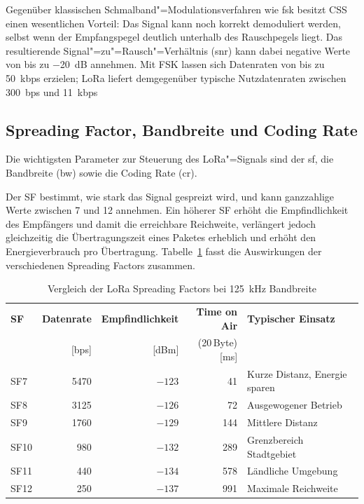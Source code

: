 Gegenüber klassischen Schmalband"=Modulationsverfahren wie \acrshort{fsk} besitzt CSS einen
wesentlichen Vorteil: Das Signal kann noch korrekt demoduliert werden, selbst wenn der
Empfangspegel deutlich unterhalb des Rauschpegels liegt. Das resultierende
Signal"=zu"=Rausch"=Verhältnis (\acrshort{snr}) kann dabei negative Werte von bis zu
\qty{-20}{dB} annehmen. Mit FSK lassen sich Datenraten von bis zu \qty{50}{kbps}
erzielen; LoRa liefert demgegenüber typische Nutzdatenraten zwischen \qty{300}{bps}
und \qty{11}{kbps}~ %

\subsection{Spreading Factor, Bandbreite und Coding Rate}
\label{subsec:sf-bw-cr}

Die wichtigsten Parameter zur Steuerung des LoRa"=Signals sind der \acrfull{sf}, 
die Bandbreite (\acrshort{bw}) sowie die Coding Rate (\acrshort{cr}).

Der SF bestimmt, wie stark das Signal gespreizt wird, und kann ganzzahlige Werte
zwischen 7 und 12 annehmen. Ein höherer SF erhöht die Empfindlichkeit des
Empfängers und damit die erreichbare Reichweite, verlängert jedoch gleichzeitig die
Übertragungszeit eines Paketes erheblich und erhöht den
Energieverbrauch pro Übertragung. Tabelle~\ref{tab:sf_vergleich} fasst die
Auswirkungen der verschiedenen Spreading Factors zusammen.

\begin{table}[htbp]
  \centering
  \caption{Vergleich der LoRa Spreading Factors bei \qty{125}{kHz} Bandbreite}
  \label{tab:sf_vergleich}
  \begin{tabular}{@{}lrrrl@{}}
    \toprule
    \textbf{SF} & \textbf{Datenrate} & \textbf{Empfindlichkeit} &
    \textbf{Time on Air} & \textbf{Typischer Einsatz} \\
                & [bps]        & [dBm]              &
    (20\,Byte) [ms] & \\
    \midrule
    SF7  & 5470 & $-123$ &  41 & Kurze Distanz, Energie sparen \\
    SF8  & 3125 & $-126$ &  72 & Ausgewogener Betrieb \\
    SF9  & 1760 & $-129$ & 144 & Mittlere Distanz \\
    SF10 &  980 & $-132$ & 289 & Grenzbereich Stadtgebiet \\
    SF11 &  440 & $-134$ & 578 & Ländliche Umgebung \\
    SF12 &  250 & $-137$ & 991 & Maximale Reichweite \\
    \bottomrule
  \end{tabular}
\end{table}

